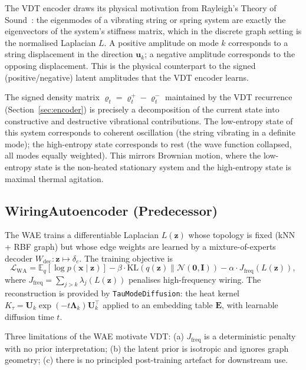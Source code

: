 \documentclass[11pt,a4paper]{article}
\newcommand{\E}{\mathbb{E}}
\newcommand{\KL}{\mathrm{KL}}
\newcommand{\N}{\mathcal{N}}
\newcommand{\elbo}{\mathcal{L}}
\newcommand{\bLambda}{\bm{\Lambda}}
\newcommand{\bU}{\bm{U}}
\newcommand{\bz}{\bm{z}}
\newcommand{\bx}{\bm{x}}
\newcommand{\bE}{\bm{E}}
\begin{document}
The VDT encoder draws its physical motivation from Rayleigh's Theory of
Sound~\citep{rayleigh1877sound}: the eigenmodes of a vibrating string or spring
system are exactly the eigenvectors of the system's stiffness matrix, which in
the discrete graph setting is the normalised Laplacian $L$.  A positive
amplitude on mode $k$ corresponds to a string displacement in the direction
$\mathbf{u}_k$; a negative amplitude corresponds to the opposing displacement.
This is the physical counterpart to the signed (positive/negative) latent
amplitudes that the VDT encoder learns.

The signed density matrix
$\varrho_t = \varrho_t^+ - \varrho_t^-$ maintained by the VDT recurrence
(Section~\ref{sec:encoder}) is precisely a decomposition of the current state
into constructive and destructive vibrational contributions.  The low-entropy
state of this system corresponds to coherent oscillation (the string vibrating
in a definite mode); the high-entropy state corresponds to rest (the wave
function collapsed, all modes equally weighted).  This mirrors Brownian
motion, where the low-entropy state is the non-heated stationary system and
the high-entropy state is maximal thermal agitation.

\subsection{WiringAutoencoder (Predecessor)}
\label{sec:wa_v1}

The WAE trains a differentiable Laplacian $L(\bz)$ whose
topology is fixed (kNN + RBF graph) but whose edge weights are learned by a
mixture-of-experts decoder $W_{\mathrm{dec}}:\bz\mapsto\delta_e$.  The
training objective is
\begin{equation}
  \elbo_{\mathrm{WA}} =
    \E_q[\log p(\bx\mid\bz)] -
    \beta\cdot\KL(q(\bz)\|\N(\mathbf{0},\bm{I})) -
    \alpha\cdot J_{\mathrm{freq}}(L(\bz)),
  \label{eq:wa_elbo}
\end{equation}
where $J_{\mathrm{freq}} = \sum_{j>k}\lambda_j(L(\bz))$ penalises
high-frequency wiring.  The reconstruction is provided by
\texttt{TauModeDiffusion}: the heat kernel
$K_\tau = \bU_k\exp(-t\bLambda_k)\bU_k^\top$ applied to an embedding table
$\bE$, with learnable diffusion time $t$.

Three limitations of the WAE motivate VDT:
(a) $J_{\mathrm{freq}}$ is a deterministic penalty with no prior
interpretation;
(b) the latent prior is isotropic and ignores graph geometry;
(c) there is no principled post-training artefact for downstream use.
\end{document}
